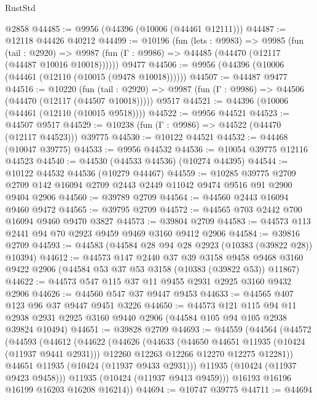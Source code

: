 \begin{lexlean}{RustStd}
\begin{coremodule}
    @2858
@44485 := @9956 (@44396 (@10006 (@44461 @12111)))
@44487 := @12118 @44426 @40212
@44499 := @10196
    (fun (lets : @9983) =>
    @9985
      (fun (tail : @2920) =>
      @9987 (fun (Γ : @9986) => @44485 (@44470 (@12117 (@44487 @10016 @10018))))))
    @9477
@44506 := @9956 (@44396 (@10006 (@44461 (@12110 (@10015 (@9478 @10018))))))
@44507 := @44487 @9477
@44516 := @10220
    (fun (tail : @2920) => @9987 (fun (Γ : @9986) => @44506 (@44470 (@12117 (@44507 @10018)))))
    @9517
@44521 := @44396 (@10006 (@44461 (@12110 (@10015 @9518))))
@44522 := @9956 @44521
@44523 := @44507 @9517
@44529 := @10238 (fun (Γ : @9986) => @44522 (@44470 (@12117 @44523))) @39775
@44530 := @10122 @44521
@44532 := @44468 (@10047 @39775)
@44533 := @9956 @44532
@44536 := @10054 @39775 @12116 @44523
@44540 := @44530 (@44533 @44536) (@10274 @44395)
@44544 := @10122 @44532 @44536 (@10279 @44467)
@44559 := @10285
    @39775
    @2709
    @2709
    @142
    @16094
    @2709
    @2443
    @2449
    @11042
    @9474
    @9516
    @91
    @2900
    @9404
    @2906
@44560 := @39789 @2709
@44564 := @44560 @2443 @16094 @9460 @9472
@44565 := @39795 @2709
@44572 := @44565 @703 @2442 @700 @16094 @9460 @9470 @3827
@44573 := @39804 @2709
@44583 := @44573 @113 @2441 @94 @70 @2923 @9459 @9469 @3160 @9412 @2906
@44584 := @39816 @2709
@44593 := @44583 (@44584 @28 @94 @28 @2923 (@10383 (@39822 @28)) @10394)
@44612 := @44573
    @147
    @2440
    @37
    @39
    @3158
    @9458
    @9468
    @3160
    @9422
    @2906
    (@44584 @53 @37 @53 @3158 (@10383 (@39822 @53)) @11867)
@44622 := @44573 @547 @115 @37 @11 @9455 @2931 @2925 @3160 @9432 @2906
@44626 := @44560 @547 @37 @9447 @9453
@44633 := @44565 @407 @123 @96 @37 @9447 @9451 @3226
@44650 := @44573
    @121
    @115
    @94
    @11
    @2938
    @2931
    @2925
    @3160
    @9440
    @2906
    (@44584 @105 @94 @105 @2938 @39824 @10494)
@44651 := @39828 @2709
@44693 := @44559
    (@44564
      (@44572
        (@44593
          (@44612
            (@44622
              (@44626
                (@44633
                  (@44650 @44651 @11935 (@10424 (@11937 @9441 @2931)))
                  @12260
                  @12263
                  @12266
                  @12270
                  @12275
                  @12281))
              @44651
              @11935
              (@10424 (@11937 @9433 @2931)))
            @11935
            (@10424 (@11937 @9423 @9458)))
          @11935
          (@10424 (@11937 @9413 @9459)))
        @16193
        @16196
        @16199
        @16203
        @16208
        @16214))
@44694 := @10747 @39775
@44711 := @44694

\end{coremodule}
\end{lexlean}
